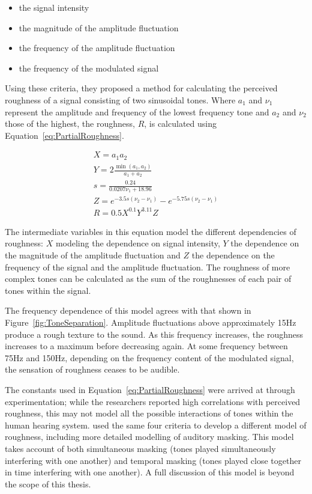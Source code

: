 		\begin{itemize}
			\item the signal intensity
			\item the magnitude of the amplitude fluctuation
			\item the frequency of the amplitude fluctuation
			\item the frequency of the modulated signal
		\end{itemize}

		Using these criteria, they proposed a method for calculating the perceived roughness of a signal consisting
		of two sinusoidal tones. Where $a_{1}$ and $\nu_{1}$ represent the amplitude and frequency of the lowest
		frequency tone and $a_{2}$ and $\nu_{2}$ those of the highest, the roughness, $R$, is calculated using
		Equation~\ref{eq:PartialRoughness}.
		
		\begin{gather}
			X = a_{1}a_{2} \nonumber \\
			Y = 2\frac{\min(a_{1}, a_{2})}{a_{1} + a_{2}} \nonumber \\
			s = \frac{0.24}{0.0207\nu_{1} + 18.96} \nonumber \\
			Z = e^{-3.5s(\nu_{2} - \nu_{1})} - e^{-5.75s(\nu_{2} - \nu_{1})} \nonumber \\
			R = 0.5X^{0.1}Y^{3.11}Z
			\label{eq:PartialRoughness}
		\end{gather}

		The intermediate variables in this equation model the different dependencies of roughness: $X$ modeling the
		dependence on signal intensity, $Y$ the dependence on the magnitude of the amplitude fluctuation and $Z$
		the dependence on the frequency of the signal and the amplitude fluctuation. The roughness of more complex
		tones can be calculated as the sum of the roughnesses of each pair of tones within the signal. 
		
		The frequency dependence of this model agrees with that shown in Figure~\ref{fig:ToneSeparation}. Amplitude
		fluctuations above approximately 15Hz produce a rough texture to the sound. As this frequency increases,
		the roughness increases to a maximum before decreasing again. At some frequency between 75Hz and 150Hz,
		depending on the frequency content of the modulated signal, the sensation of roughness ceases to be
		audible.

		The constants used in Equation~\ref{eq:PartialRoughness} were arrived at through experimentation; while the
		researchers reported high correlations with perceived roughness, this may not model all the possible
		interactions of tones within the human hearing system. \citet{fastl2007psychoacoustics} used the same four
		criteria to develop a different model of roughness, including more detailed modelling of auditory masking.
		This model takes account of both simultaneous masking (tones played simultaneously interfering with one
		another) and temporal masking (tones played close together in time interfering with one another). A full
		discussion of this model is beyond the scope of this thesis.

